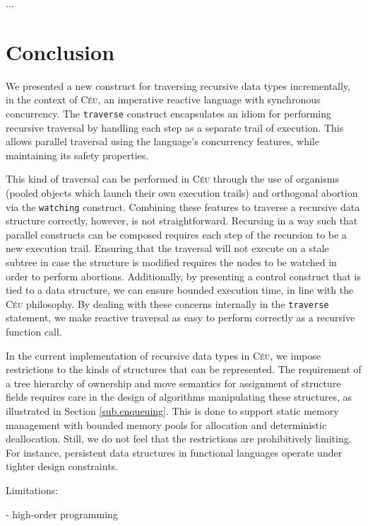 \documentclass{sig-alternate}
\newcommand{\CEU}{\textsc{C\'{e}u}\xspace}
\newcommand{\code}[1] {{\small{\texttt{#1}}}}
\begin{document}
...

\section{Conclusion}

We presented a new construct for traversing recursive data types
incrementally, in the context of \CEU, an imperative reactive language with
synchronous concurrency. The \code{traverse} construct encapsulates an idiom
for performing recursive traversal by handling each step as a separate trail
of execution. This allows parallel traversal using the language's concurrency
features, while maintaining its safety properties.

This kind of traversal can be performed in \CEU through the use of organisms
(pooled objects which launch their own execution trails) and orthogonal
abortion via the \code{watching} construct. Combining these features to
traverse a recursive data structure correctly, however, is not straightforward.
Recursing in a way such that parallel constructs can be composed requires each
step of the recursion to be a new execution trail. Ensuring that the traversal
will not execute on a stale subtree in case the structure is modified requires
the nodes to be watched in order to perform abortions. Additionally, by
presenting a control construct that is tied to a data structure, we can ensure
bounded execution time, in line with the \CEU philosophy. By dealing with these
concerns internally in the \code{traverse} statement, we make reactive
traversal as easy to perform correctly as a recursive function call.

In the current implementation of recursive data types in \CEU, we impose
restrictions to the kinds of structures that can be represented. The
requirement of a tree hierarchy of ownership and move semantics for assignment
of structure fields requires care in the design of algorithms
manipulating these structures, as illustrated in Section \ref{sub.enqueuing}.
This is done to support static memory management with bounded memory pools for
allocation and deterministic deallocation. Still, we do not feel that the
restrictions are prohibitively limiting. For instance, persistent data
structures in functional languages \cite{TODO} operate under tighter design constraints.

Limitations:

- high-order programming



\balancecolumns
\end{document}
